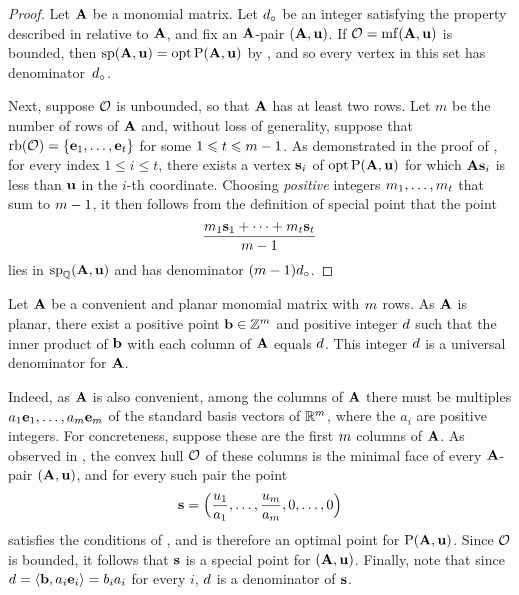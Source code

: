 \documentclass{amsart}
\begin{document}
\begin{proof}
   Let $\mathbf{A}$ be a monomial matrix.
   Let $d_{\circ}$ be an integer satisfying the property described in  relative to $\mathbf{A}$, and fix an $\mathbf{A}$-pair $(\mathbf{A}, \mathbf{u})$.
   If $\mathcal{O} = \operatorname{mf}(\mathbf{A}, \mathbf{u})$ is bounded, then $\operatorname{sp}(\mathbf{A}, \mathbf{u}) = \operatorname{opt} \mathrm{P}(\mathbf{A}, \mathbf{u})$ by , and so every vertex in this set has denominator~$d_{\circ}$.

   Next, suppose $\mathcal{O}$ is unbounded, so that $\mathbf{A}$ has at least two rows.
   Let $m$ be the number of rows of $\mathbf{A}$ and, without loss of generality, suppose that $\operatorname{rb}(\mathcal{O}) = \{ \mathbf{e}_1, \ldots, \mathbf{e}_t \}$ for some $1 \leqslant t \leqslant m-1$.
   As demonstrated in the  proof of , for every index  $1 \leq i \leq t$, there exists a vertex $\mathbf{s}_i$ of $\operatorname{opt} \mathrm{P}(\mathbf{A}, \mathbf{u})$ for which $\mathbf{A} \mathbf{s}_i$ is less than $\mathbf{u}$ in the $i$-th coordinate.
   Choosing \emph{positive} integers $m_1, \ldots, m_t$ that sum to $m-1$, it then follows from the definition of special point that the point
   \[ \frac{ m_1 \mathbf{s}_1 + \cdots + m_t  \mathbf{s}_t}{m-1}  \]
   lies in $\operatorname{sp}_{\mathbb{Q}}(\mathbf{A}, \mathbf{u})$ and has denominator $(m-1)d_{\circ}$.
\end{proof}

\begin{example}
   \label{ex: convenient planar case 2}
   Let $\mathbf{A}$ be a convenient and planar monomial matrix with $m$ rows.
   As $\mathbf{A}$ is planar, there exist a positive point $\mathbf{b} \in \mathbb{Z}^m$ and positive integer $d$ such that the inner product of $\mathbf{b}$ with each column of $\mathbf{A}$ equals $d$.
   This integer $d$ is a universal denominator for $\mathbf{A}$.

   Indeed, as $\mathbf{A}$ is also convenient, among the columns of $\mathbf{A}$ there must be multiples $a_1\mathbf{e}_1,\ldots,a_m\mathbf{e}_m$ of the standard basis vectors of $\mathbb{R}^m$, where the $a_i$ are positive integers.
   For concreteness, suppose these are the first $m$ columns of $\mathbf{A}$.
   As observed in , the convex hull $\mathcal{O}$ of these columns is the minimal face of every $\mathbf{A}$-pair $(\mathbf{A},\mathbf{u})$, and for every such pair the point
   \[\mathbf{s} = \Big(\frac{u_1}{a_1},\ldots,\frac{u_m}{a_m},0,\ldots,0\Big)\]
   satisfies the conditions of , and is therefore an optimal point for $\mathrm{P}(\mathbf{A},\mathbf{u})$.
   Since $\mathcal{O}$ is bounded, it follows that $\mathbf{s}$ is a special point for $(\mathbf{A},\mathbf{u})$.
   Finally, note that since $d = \langle \mathbf{b}, a_i\mathbf{e}_i \rangle = b_ia_i$ for every $i$, $d$ is a denominator of $\mathbf{s}$.
\end{example}
\end{document}
